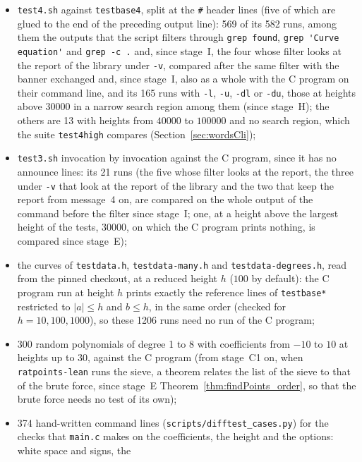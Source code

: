 \begin{itemize}
  \item \verb|test4.sh| against \verb|testbase4|, split at the \verb|#| header lines (five of which
    are glued to the end of the preceding output line): 569 of its 582 runs, among them the outputs
    that the script filters through \verb|grep found|, \verb|grep 'Curve equation'| and
    \verb|grep -c .| and, since stage~I, the four whose filter looks at the report of the library
    under \verb|-v|, compared after the same filter with the banner exchanged and, since stage~I,
    also as a whole with the C program on their command line, and its 165 runs with \verb|-l|,
    \verb|-u|, \verb|-dl| or \verb|-du|, those at heights above $30000$ in a narrow search region
    among them (since stage~H); the others are 13 with heights from $40000$ to $100000$ and no
    search region, which the suite \verb|test4high| compares (Section~\ref{sec:wordsCli});
  \item \verb|test3.sh| invocation by invocation against the C program, since it has no announce
    lines: its 21 runs (the five whose filter looks at the report, the three under \verb|-v| that
    look at the report of the library and the two that keep the report from message~4 on, are
    compared on the whole output of the command before the filter since stage~I; one, at a height
    above the largest height of the tests, $30000$, on which the C program prints nothing, is
    compared since stage~E);
  \item the curves of \verb|testdata.h|, \verb|testdata-many.h| and \verb|testdata-degrees.h|,
    read from the pinned checkout, at a reduced height $h$ ($100$ by default): the C program run
    at height $h$ prints exactly the reference lines of \verb|testbase*| restricted to
    $|a| \le h$ and $b \le h$, in the same order (checked for $h = 10, 100, 1000$), so these 1206
    runs need no run of the C program;
  \item 300 random polynomials of degree 1 to 8 with coefficients from $-10$ to $10$ at heights
    up to 30, against the C program (from stage~C1 on, when \verb|ratpoints-lean| runs the sieve,
    a theorem relates the list of the sieve to that of the brute force, since stage~E
    Theorem~\ref{thm:findPoints_order}, so that the brute force needs no test of its own);
  \item 374 hand-written command lines (\verb|scripts/difftest_cases.py|) for the checks that
    \verb|main.c| makes on the coefficients, the height and the options: white space and signs, the

\end{itemize}
